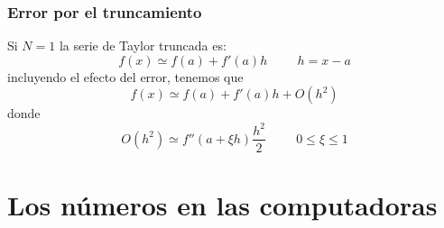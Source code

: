 \begin{frame}
\frametitle{Error por el truncamiento}
Si $N=1$ la serie de Taylor truncada es:
\[f(x) \simeq f(a) + f'(a) h \hspace{1cm} h=x-a\]
incluyendo el efecto del error, tenemos que
\[f(x) \simeq f(a) + f'(a) h + O(h^{2}) \]
donde
\[O(h^{2}) \simeq f''(a+ \xi h) \dfrac{h^{2}}{2} \hspace{1cm} 0 \leq \xi \leq 1\]
\end{frame}





\section{Los números en las computadoras}
